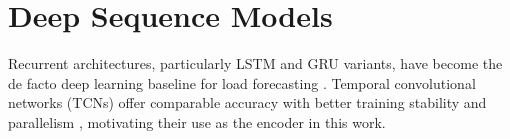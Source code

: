 \section{Deep Sequence Models}
Recurrent architectures, particularly LSTM and GRU variants, have become the de facto deep
learning baseline for load forecasting \cite{hochreiter1997long}. Temporal convolutional
networks (TCNs) offer comparable accuracy with better training stability and parallelism
\cite{bai2018empirical}, motivating their use as the encoder in this work.
